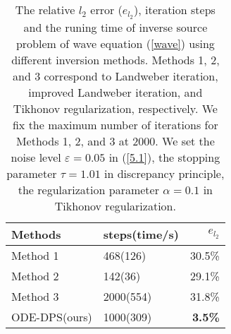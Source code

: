 \documentclass[mathserif,envcountsect,compress,8pt]{beamer}
\begin{document}
\begin{frame}

	\begin{table}[htbp!]
		
		\begin{center}
			\begin{tabular}{llr}
				\toprule[1pt]
				Methods       & steps(time/s) & $e_{l_2}$      \\
				\hline
				Method 1      & 468(126)      & 30.5\%         \\
				Method 2      & 142(36)       & 29.1\%         \\
				Method 3      & 2000(554)     & 31.8\%         \\
				ODE-DPS(ours) & 1000(309)     & \textbf{3.5\%} \\
				\bottomrule[1pt]
			\end{tabular}
		\end{center}
		\caption{The relative $l_2$ error ($e_{l_2}$), iteration steps and the runing time of inverse source problem of wave equation (\ref{wave}) using different inversion methods. Methods 1, 2, and 3 correspond to Landweber iteration, improved Landweber iteration, and Tikhonov regularization, respectively. We fix the maximum number of iterations for Methods 1, 2, and 3 at 2000. We set the noise level $\varepsilon=0.05$ in (\ref{5.1}), the stopping parameter $\tau=1.01$ in discrepancy principle, the regularization parameter $\alpha=0.1$ in Tikhonov regularization.}
		\label{wave_source_table}
	\end{table}
\end{frame}
\end{document}
